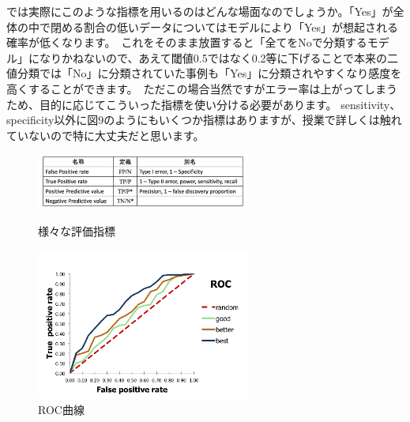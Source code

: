 \documentclass[uplatex]{jsarticle}
\begin{document}
では実際にこのような指標を用いるのはどんな場面なのでしょうか。「Yes」が全体の中で閉める割合の低いデータについてはモデルにより「Yes」が想起される確率が低くなります。\
これをそのまま放置すると「全てをNoで分類するモデル」になりかねないので、あえて閾値0.5ではなく0.2等に下げることで本来の二値分類では「No」に分類されていた事例も「Yes」に分類されやすくなり感度を高くすることができます。\
ただこの場合当然ですがエラー率は上がってしまうため、目的に応じてこういった指標を使い分ける必要があります。
sensitivity、specificity以外に図9のようにもいくつか指標はありますが、授業で詳しくは触れていないので特に大丈夫だと思います。
\begin{figure}[htbp]
\begin{minipage}{0.5\hsize}
 \begin{center}
  \includegraphics[width=70mm]{img/sihyo.png}
 \end{center}
 \caption{様々な評価指標}
 \label{fig:one}
\end{minipage}
\begin{minipage}{0.5\hsize}
 \begin{center}
  \includegraphics[width=70mm]{img/ROC.png}
 \end{center}
 \caption{ROC曲線}
 \label{fig:two}
\end{minipage}
\end{figure}
\end{document}
